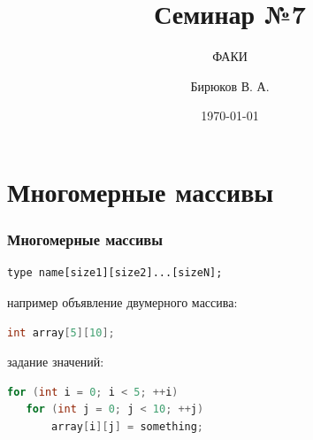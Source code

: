 \documentclass[12pt,pdf,hyperref={unicode}]{beamer}
\title{Семинар №7}
\subtitle{ФАКИ \the\year}
\author{Бирюков В. А.}
\date{\today}
\begin{document}
\lstset{language=C}

\begin{frame}
\titlepage
\end{frame} 






\section{Многомерные массивы}

\begin{frame}[fragile]
\frametitle{Многомерные массивы} 
\begin{verbatim}
type name[size1][size2]...[sizeN];
\end{verbatim}
например объявление двумерного массива:
\begin{lstlisting}[language=C++,basicstyle=\ttfamily,keywordstyle=\color{blue}]
int array[5][10];
\end{lstlisting}
задание значений:
\begin{lstlisting}[language=C++,basicstyle=\ttfamily,keywordstyle=\color{blue}, showtabs]
for (int i = 0; i < 5; ++i)
   for (int j = 0; j < 10; ++j)
       array[i][j] = something;
\end{lstlisting}
\end{frame}
\end{document}
